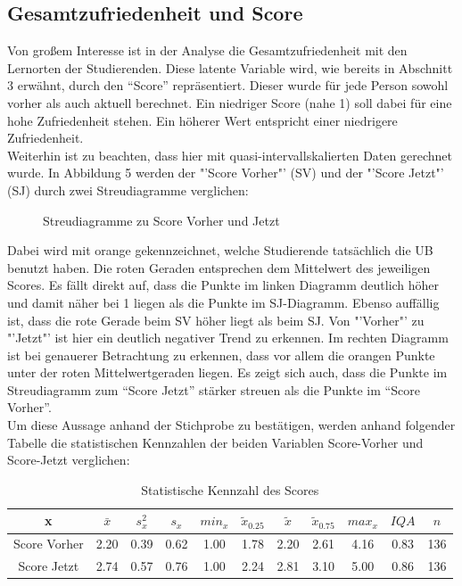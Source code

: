\documentclass[11pt, a4paper]{article}
\begin{document}
\subsection{Gesamtzufriedenheit und Score}



Von großem Interesse ist in der Analyse die Gesamtzufriedenheit mit den Lernorten der Studierenden.
Diese latente Variable wird, wie bereits in Abschnitt 3 erwähnt, durch den “Score” repräsentiert. Dieser wurde für jede Person sowohl vorher als auch aktuell berechnet.
Ein niedriger Score (nahe 1) soll dabei für eine hohe Zufriedenheit stehen. Ein höherer Wert entspricht einer niedrigere Zufriedenheit.\\
Weiterhin ist zu beachten, dass hier mit quasi-intervallskalierten Daten gerechnet wurde.
In Abbildung 5 werden der "'Score Vorher"' (SV) und der "'Score Jetzt"' (SJ) durch zwei Streudiagramme verglichen:

\vspace{-0.5cm}
\begin{figure}[h]

\vspace{-1.8cm}
\caption{Streudiagramme zu Score Vorher und Jetzt}
\vspace{1cm}
\end{figure}
Dabei wird mit orange gekennzeichnet, welche Studierende tatsächlich die UB benutzt haben. Die roten Geraden entsprechen dem Mittelwert des jeweiligen Scores.
Es fällt direkt auf, dass die Punkte im linken Diagramm deutlich höher und damit näher bei 1 liegen als die Punkte im SJ-Diagramm.
Ebenso auffällig ist, dass die rote Gerade beim SV höher liegt als beim SJ.
Von "'Vorher"' zu "'Jetzt"' ist hier ein deutlich negativer Trend zu erkennen.
Im rechten Diagramm ist bei genauerer Betrachtung zu erkennen, dass vor allem die orangen Punkte unter der roten Mittelwertgeraden liegen.
Es zeigt sich auch, dass die Punkte im Streudiagramm zum “Score Jetzt” stärker streuen als die Punkte im “Score Vorher”.\\
Um diese Aussage anhand der Stichprobe zu bestätigen, werden anhand folgender Tabelle die statistischen Kennzahlen der beiden Variablen Score-Vorher und Score-Jetzt verglichen: 



\begin{table}[h]
	\begin{center}
	\vspace{0.2cm}
	\begin{tabular}{c|ccccccccc|c}
		x & $\bar{x}$ & $s_x^2$ & $s_x$ & $min_x$ & $\tilde{x}_{0.25}$ & $\tilde{x}$ & $\tilde{x}_{0.75}$ & $max_x$ & $IQA$ & $n$ \\ \hline
		Score Vorher & 2.20 & 0.39 & 0.62 & 1.00 & 1.78 & 2.20 & 2.61 & 4.16 & 0.83 & 136 \\
		Score Jetzt & 2.74 & 0.57 & 0.76 & 1.00 & 2.24 & 2.81 & 3.10 & 5.00 & 0.86 & 136
	\end{tabular}
	\vspace{0.2cm}
	\caption{Statistische Kennzahl des Scores}
\end{center}
\end{table}
\end{document}
